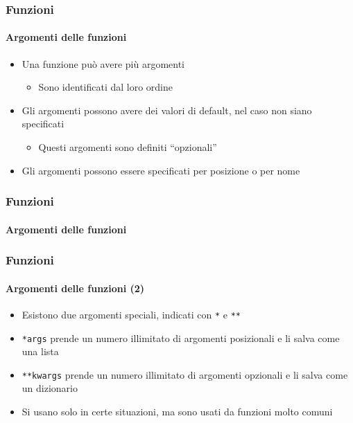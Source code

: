\begin{contentframe}
    \frametitle{Funzioni}
    \framesubtitle{Argomenti delle funzioni}

    \begin{itemize}
        \item Una funzione può avere più argomenti
        \begin{itemize}
            \item Sono identificati dal loro ordine
        \end{itemize}

        \bigskip
        \item Gli argomenti possono avere dei valori di default, nel caso non siano specificati
        \begin{itemize}
            \item Questi argomenti sono definiti ``opzionali''
        \end{itemize}

        \bigskip
        \item Gli argomenti possono essere specificati per posizione o per nome
    \end{itemize}
\end{contentframe}

\begin{contentframe}
    \frametitle{Funzioni}
    \framesubtitle{Argomenti delle funzioni}

    \centering
\end{contentframe}

\begin{contentframe}
    \frametitle{Funzioni}
    \framesubtitle{Argomenti delle funzioni (2)}

    \begin{itemize}
        \item Esistono due argomenti speciali, indicati con \texttt{*} e \texttt{**}
        
        \bigskip
        \item \texttt{*args} prende un numero illimitato di argomenti posizionali e li salva come una lista

        \bigskip
        \item \texttt{**kwargs} prende un numero illimitato di argomenti opzionali e li salva come un dizionario

        \bigskip
        \item Si usano solo in certe situazioni, ma sono usati da funzioni molto comuni 
    \end{itemize}
\end{contentframe}

